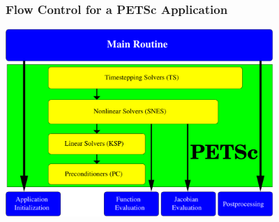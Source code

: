 \begin{frame}[fragile]
\frametitle{Flow Control for a PETSc Application}

\begin{center}
\includegraphics[width=4.0in]{figures/FlowControl}
\end{center}
\end{frame}
